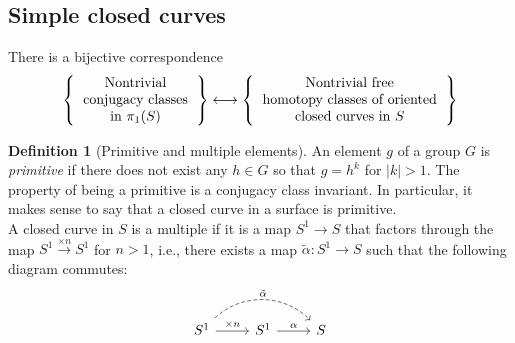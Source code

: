 \documentclass[reqno]{amsart}
\theoremstyle{definition}
\newtheorem{definition}[theorem]{Definition}
\theoremstyle{remark}
\begin{document}
    \subsection{Simple closed curves}
There is a bijective correspondence
\[
\left\{ 
    \begin{tabular}{c}
    Nontrivial\\
    conjugacy classes\\
    in $\pi_1 (S)$
\end{tabular}
\right\} 
\longleftrightarrow
\left\{ 
    \begin{tabular}{c}
        Nontrivial free\\
        homotopy classes of oriented\\
        closed curves in $S$
\end{tabular}
\right\} 
\] 

\begin{definition}[Primitive and multiple elements]
    An element $g$ of a group $G$ is \textit{primitive} if there
    does not exist any $h \in G$ so that $g = h^{k}$ for
    $\left| k \right| >1$. The property of being a primitive
    is a conjugacy class invariant. In particular, it makes
    sense to say that a closed curve in a surface is primitive.\\
    A closed curve in $S$ is a multiple if it is a map
    $S^{1} \to S$ that factors through the map
    $S^{1} \stackrel{\times n}{\to } S^{1}$ for
    $n >1$, i.e., there exists a map $\tilde{\alpha} \colon
    S^{1} \to S$ such that the following diagram commutes:
    \begin{equation*}
    \begin{tikzcd}
        S^{1} \ar[r, "\times n"] \ar[rr, bend left = 45, dashed,
        "\tilde{\alpha}"] & S^{1} \ar[r,
        "\alpha"] & S
    \end{tikzcd}
    \end{equation*}
\end{definition}
\end{document}
